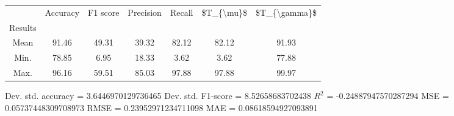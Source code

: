 \begin{tabular}{|c|c|c|c|c|c|c|}
\toprule
{} &  Accuracy &  F1 score &  Precision &  Recall &  \$T\_\{\textbackslash mu\}\$ &  \$T\_\{\textbackslash gamma\}\$ \\
Results &           &           &            &         &            &               \\
\hline
Mean    &     91.46 &     49.31 &      39.32 &   82.12 &      82.12 &         91.93 \\
Min.    &     78.85 &      6.95 &      18.33 &    3.62 &       3.62 &         77.88 \\
Max.    &     96.16 &     59.51 &      85.03 &   97.88 &      97.88 &         99.97 \\
\bottomrule
\end{tabular}

 Dev. std. accuracy = 3.6446970129736465
 Dev. std. F1-score = 8.52658683702438
 $R^2$ = -0.24887947570287294
 MSE = 0.05737448309708973
 RMSE = 0.23952971234711098
 MAE = 0.08618594927093891